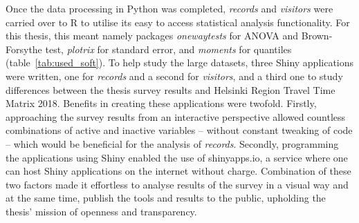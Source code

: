 Once the data processing in Python was completed, \textit{records} and \textit{visitors} were carried over to R to utilise its easy to access statistical analysis functionality. For this thesis, this meant namely packages \textit{onewaytests} for ANOVA and Brown-Forsythe test, \textit{plotrix} for standard error, and \textit{moments} for quantiles (table~\ref{tab:used_soft}). To help study the large datasets, three Shiny applications were written, one for \textit{records} and a second for \textit{visitors}, and a third one to study differences between the thesis survey results and Helsinki Region Travel Time Matrix 2018. Benefits in creating these applications were twofold. Firstly, approaching the survey results from an interactive perspective allowed countless combinations of active and inactive variables -- without constant tweaking of code -- which would be beneficial for the analysis of \textit{records}. Secondly, programming the applications using Shiny enabled the use of shinyapps.io, a service where one can host Shiny applications on the internet without charge. Combination of these two factors made it effortless to analyse results of the survey in a visual way and at the same time, publish the tools and results to the public, upholding the thesis' mission of openness and transparency.

